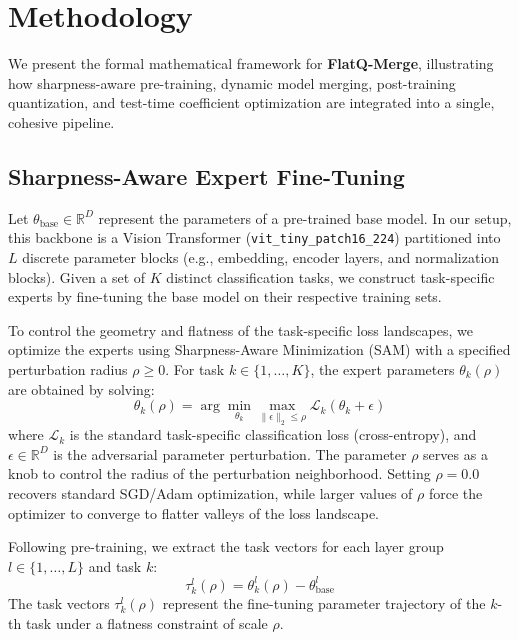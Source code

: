 \section{Methodology}
\label{sec:method}

We present the formal mathematical framework for \textbf{FlatQ-Merge}, illustrating how sharpness-aware pre-training, dynamic model merging, post-training quantization, and test-time coefficient optimization are integrated into a single, cohesive pipeline.

\subsection{Sharpness-Aware Expert Fine-Tuning}
Let $\theta_{\text{base}} \in \mathbb{R}^D$ represent the parameters of a pre-trained base model. In our setup, this backbone is a Vision Transformer (\texttt{vit\_tiny\_patch16\_224}) partitioned into $L$ discrete parameter blocks (e.g., embedding, encoder layers, and normalization blocks). Given a set of $K$ distinct classification tasks, we construct task-specific experts by fine-tuning the base model on their respective training sets.

To control the geometry and flatness of the task-specific loss landscapes, we optimize the experts using Sharpness-Aware Minimization (SAM) \cite{Foret2020SAM} with a specified perturbation radius $\rho \ge 0$. For task $k \in \{1, \dots, K\}$, the expert parameters $\theta_k(\rho)$ are obtained by solving:
\begin{equation}
\label{eq:sam}
\theta_k(\rho) = \arg\min_{\theta_k} \max_{\|\epsilon\|_2 \le \rho} \mathcal{L}_k(\theta_k + \epsilon)
\end{equation}
where $\mathcal{L}_k$ is the standard task-specific classification loss (cross-entropy), and $\epsilon \in \mathbb{R}^D$ is the adversarial parameter perturbation. The parameter $\rho$ serves as a knob to control the radius of the perturbation neighborhood. Setting $\rho = 0.0$ recovers standard SGD/Adam optimization, while larger values of $\rho$ force the optimizer to converge to flatter valleys of the loss landscape.

Following pre-training, we extract the task vectors for each layer group $l \in \{1, \dots, L\}$ and task $k$:
\begin{equation}
\label{eq:task_vector}
\tau^l_k(\rho) = \theta^l_k(\rho) - \theta^l_{\text{base}}
\end{equation}
The task vectors $\tau^l_k(\rho)$ represent the fine-tuning parameter trajectory of the $k$-th task under a flatness constraint of scale $\rho$.

